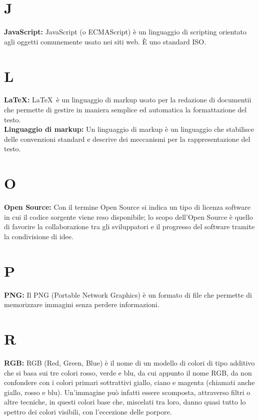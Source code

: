 \section*{J}
\hypertarget{javascript}{}
\textbf{JavaScript:}
JavaScript (o ECMAScript) \`e un linguaggio di scripting orientato agli oggetti comunemente usato nei siti web. \`E  uno standard ISO.\\

\section*{L}
\hypertarget{latex}{}
\textbf{\LaTeX:}
\LaTeX \ \`e un linguaggio di markup usato per la redazione di documentii che permette di gestire in maniera semplice ed automatica la formattazione del testo.\\

\textbf{Linguaggio di markup:}
\hypertarget{markup}{}
Un linguaggio di markup \`e un linguaggio che stabilisce delle convenzioni standard e descrive dei meccanismi per la rappresentazione del testo.\\

\section*{O}
\hypertarget{opensource}{}
\textbf{Open Source:}
Con il termine Open Source si indica un tipo di licenza software in cui il codice sorgente viene reso disponibile; lo scopo dell'Open Source \`e quello di favorire la collaborazione tra gli sviluppatori e il progresso del software tramite la condivisione di idee.\\

\section*{P}
\hypertarget{png}{}
\textbf{PNG:}
Il PNG (Portable Network Graphics) \`e un formato di file che permette di memorizzare immagini senza perdere informazioni.\\

\section*{R}
\hypertarget{rgb}{}
\textbf{RGB:}
RGB (Red, Green, Blue) \`e  il nome di un modello di colori di tipo additivo che si basa sui tre colori rosso, verde e blu, da cui appunto il nome RGB, da non confondere con i colori primari sottrattivi giallo, ciano e magenta (chiamati anche giallo, rosso e blu).
Un'immagine pu\`o  infatti essere scomposta, attraverso filtri o altre tecniche, in questi colori base che, miscelati tra loro, danno quasi tutto lo spettro dei colori visibili, con l'eccezione delle porpore.

